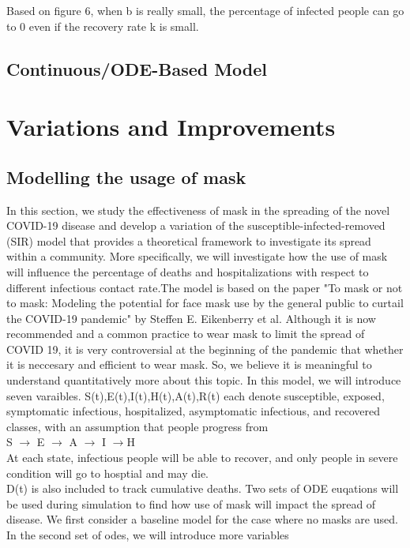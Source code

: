 \documentclass{article}
\begin{document}
Based on figure 6, when b is really small, the percentage of infected people can go to 0 even if the recovery rate k is small. 




\subsection{Continuous/ODE-Based Model}











\section{Variations and Improvements}
\subsection{Modelling the usage of mask}
In this section, we study the effectiveness of mask in the spreading of the novel COVID-19 disease and develop a variation of the susceptible-infected-removed (SIR) model that provides a theoretical framework to investigate its spread within a community. More specifically, we will investigate how the use of mask will influence the percentage of deaths and hospitalizations with respect to different infectious contact rate.The model is based on the paper "To mask or not to mask: Modeling the potential for face mask use by the general public to curtail the COVID-19 pandemic" by Steffen E. Eikenberry et al. Although it is now recommended and a common practice to wear mask to limit the spread of COVID 19, it is very controversial at the beginning of the pandemic that whether it is neccesary and efficient to wear mask. So, we believe it is meaningful to understand quantitatively more about this topic.
In this model, we will introduce seven varaibles. S(t),E(t),I(t),H(t),A(t),R(t) each denote susceptible, exposed, symptomatic infectious, hospitalized, asymptomatic infectious, and recovered classes, with an assumption that people progress from \\
S $\rightarrow$ E $\rightarrow$ A $\rightarrow$ I $\rightarrow$H \\ At each state, infectious people will be able to recover, and only people in severe condition will go to hosptial and may die.\\D(t) is also included to track cumulative deaths. Two sets of ODE euqations will be used during simulation to find how use of mask will impact the spread of disease. We first consider a baseline model for the case where no masks are used. In the second set of odes, we will introduce more variables
\end{document}
